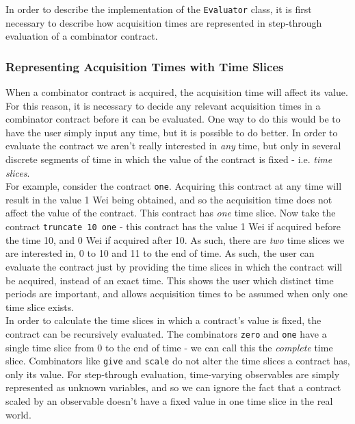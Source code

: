 In order to describe the implementation of the \texttt{Evaluator} class, it is first necessary to describe how acquisition times are represented in step-through evaluation of a combinator contract.


\subsubsection{Representing Acquisition Times with Time Slices} \label{time-slices}

When a combinator contract is acquired, the acquisition time will affect its value. For this reason, it is necessary to decide any relevant acquisition times in a combinator contract before it can be evaluated. One way to do this would be to have the user simply input any time, but it is possible to do better. In order to evaluate the contract we aren't really interested in \textit{any} time, but only in several discrete segments of time in which the value of the contract is fixed - i.e. \textit{time slices}. \\

For example, consider the contract \texttt{one}. Acquiring this contract at any time will result in the value 1 Wei being obtained, and so the acquisition time does not affect the value of the contract. This contract has \textit{one} time slice. Now take the contract \texttt{truncate 10 one} - this contract has the value 1 Wei if acquired before the time 10, and 0 Wei if acquired after 10. As such, there are \textit{two} time slices we are interested in, 0 to 10 and 11 to the end of time. As such, the user can evaluate the contract just by providing the time slices in which the contract will be acquired, instead of an exact time. This shows the user which distinct time periods are important, and allows acquisition times to be assumed when only one time slice exists. \\

In order to calculate the time slices in which a contract's value is fixed, the contract can be recursively evaluated. The combinators \texttt{zero} and \texttt{one} have a single time slice from 0 to the end of time - we can call this the \textit{complete} time slice. Combinators like \texttt{give} and \texttt{scale} do not alter the time slices a contract has, only its value. For step-through evaluation, time-varying observables are simply represented as unknown variables, and so we can ignore the fact that a contract scaled by an observable doesn't have a fixed value in one time slice in the real world. \\

